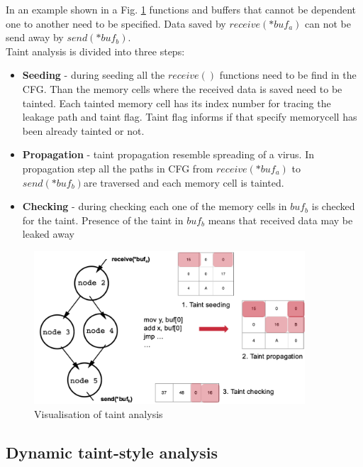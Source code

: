\documentclass[a4paper, 12pt, journal, onecolumn]{IEEEtran}
\begin{document}
In an example shown in a Fig. \ref{fig:taint} functions and buffers that cannot be dependent one to another need to be specified. Data saved by $receive(*buf_a)$ can not be send away by $send(*buf_b)$. 
\\

Taint analysis is divided into three steps:\\
\begin{itemize}
\item \textbf{Seeding} - during seeding all the $receive()$ functions need to be find in the CFG. Than the memory cells where the received data is saved need to be tainted. Each tainted memory cell has its index number for tracing the leakage path and taint flag. Taint flag informs if that specify memorycell has been already tainted or not.\\
\item \textbf{Propagation} - taint propagation resemble spreading of a virus. In propagation step all the paths in CFG from $receive(*buf_a)$ to $send(*buf_b)$are traversed and each memory cell is tainted.\\
\item \textbf{Checking} - during checking each one of the memory cells in $buf_b$ is checked for the taint. Presence of the taint in $buf_b$ means that received data may be leaked away\\
\end{itemize}

\begin{figure}[ht]
    \centering
    \captionsetup{justification=centering}
    \includegraphics[width=0.9\textwidth]{Taint.png}
    \caption{Visualisation of taint analysis}
    \label{fig:taint}
\end{figure}

\subsection{Dynamic taint-style analysis}
\end{document}
